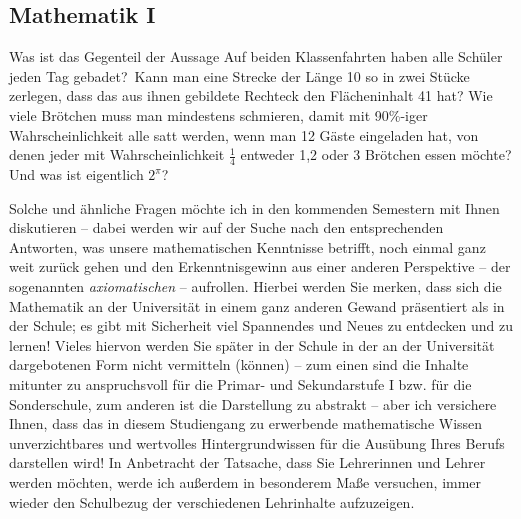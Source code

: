 \subsection{Mathematik I}

Was ist das Gegenteil der Aussage \glqq Auf beiden Klassenfahrten haben alle
Schüler jeden Tag gebadet?\grqq\ Kann man eine Strecke der Länge 10 so in zwei
Stücke zerlegen, dass das aus ihnen gebildete Rechteck den Flächeninhalt 41
hat? Wie viele Brötchen muss man mindestens schmieren, damit mit 90\%-iger
Wahrscheinlichkeit alle satt werden, wenn man 12 Gäste eingeladen hat, von
denen jeder mit Wahrscheinlichkeit $\frac 1 4$ entweder 1,2 oder 3 Brötchen
essen möchte? Und was ist eigentlich $2^\pi$?

Solche und ähnliche Fragen möchte ich in den kommenden Semestern mit Ihnen
diskutieren -- dabei werden wir auf der Suche nach den entsprechenden
Antworten, was unsere mathematischen Kenntnisse betrifft, noch einmal ganz weit
zurück gehen und den Erkenntnisgewinn aus einer anderen Perspektive -- der
sogenannten \emph{axiomatischen} -- aufrollen. Hierbei werden Sie merken, dass
sich die Mathematik an der Universität in einem ganz anderen Gewand präsentiert
als in der Schule; es gibt mit Sicherheit viel Spannendes und Neues zu
entdecken und zu lernen! Vieles hiervon werden Sie später in der Schule in der
an der Universität dargebotenen Form nicht vermitteln (können) -- zum einen
sind die Inhalte mitunter zu anspruchsvoll für die Primar- und Sekundarstufe I
bzw. für die Sonderschule, zum anderen ist die Darstellung zu abstrakt -- aber
ich versichere Ihnen, dass das in diesem Studiengang zu erwerbende
mathematische Wissen unverzichtbares und wertvolles Hintergrundwissen für die
Ausübung Ihres Berufs darstellen wird! In Anbetracht der Tatsache, dass Sie
Lehrerinnen und Lehrer werden möchten, werde ich außerdem in besonderem Maße
versuchen, immer wieder den Schulbezug der verschiedenen Lehrinhalte
aufzuzeigen.

